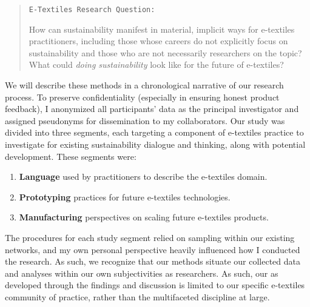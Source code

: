 \begin{quote}

\texttt{E-Textiles Research Question:}

How can sustainability manifest in material, implicit ways for e-textiles practitioners, including those whose careers do not explicitly focus on sustainability and those who are not necessarily researchers on the topic? What could \textit{doing sustainability} look like for the future of e-textiles?
\end{quote}  

We will describe these methods in a chronological narrative of our research process. To preserve confidentiality (especially in ensuring honest product feedback), I anonymized all participants' data as the principal investigator and assigned pseudonyms for dissemination to my collaborators.
Our study was divided into three segments, each targeting a component of e-textiles practice to investigate for existing sustainability dialogue and thinking, along with potential development. These segments were:

\begin{enumerate}
  \item \textbf{Language} used by practitioners to describe the e-textiles domain.
  \item \textbf{Prototyping} practices for future e-textiles technologies. 
  \item \textbf{Manufacturing} perspectives on scaling future e-textiles products.
\end{enumerate}

The procedures for each study segment relied on sampling within our existing networks, and my own personal perspective heavily influenced how I conducted the research. As such, we recognize that
our methods situate our collected data and analyses within our own subjectivities as researchers. As such, our  as developed through the findings and discussion is limited to our specific e-textiles community of practice, rather than the multifaceted discipline at large.


